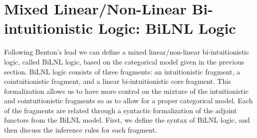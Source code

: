 \documentclass{lmcs}
\begin{document}

\section{Mixed Linear/Non-Linear Bi-intuitionistic Logic: BiLNL Logic}
\label{sec:bilnl_logic}

Following Benton's \cite{Benton:1994} lead we can define a mixed
linear/non-linear bi-intuitionistic logic, called BiLNL logic, based
on the categorical model given in the previous section.  BiLNL logic
consists of three fragments: an intuitionistic fragment, a
cointuitionistic fragment, and a linear bi-intuitionistic core
fragment.  This formalization allows us to have more control on the
mixture of the intuitionistic and cointuitionistic fragments so as to
allow for a proper categorical model.  Each of the fragments are
related through a syntactic formalization of the adjoint functors from
the BiLNL model.  First, we define the syntax of BiLNL logic, and then
discuss the inference rules for each fragment.
\end{document}
